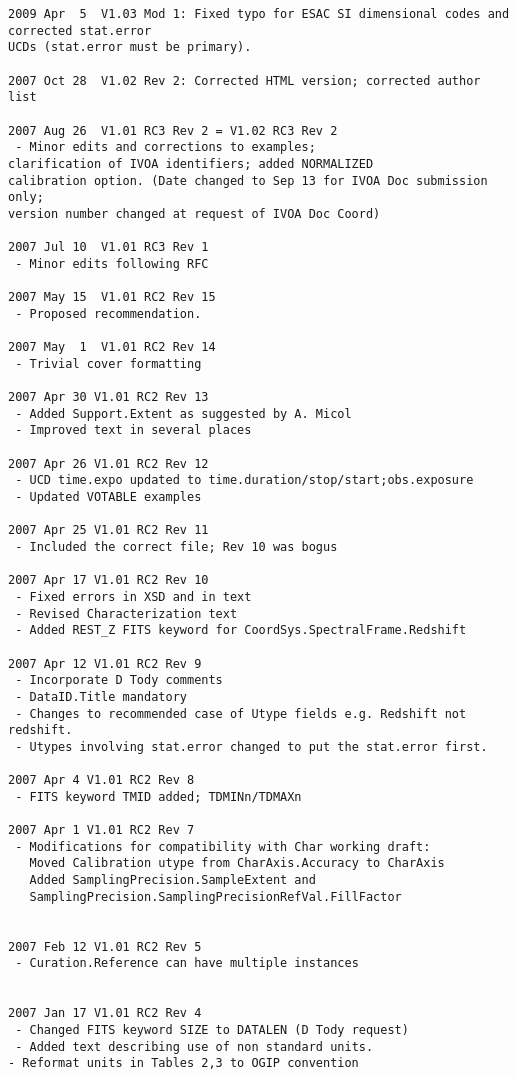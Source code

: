 \documentclass[11pt]{article}
\begin{document}
\begin{verbatim}
2009 Apr  5  V1.03 Mod 1: Fixed typo for ESAC SI dimensional codes and corrected stat.error
UCDs (stat.error must be primary).

2007 Oct 28  V1.02 Rev 2: Corrected HTML version; corrected author list

2007 Aug 26  V1.01 RC3 Rev 2 = V1.02 RC3 Rev 2
 - Minor edits and corrections to examples;
clarification of IVOA identifiers; added NORMALIZED
calibration option. (Date changed to Sep 13 for IVOA Doc submission only;
version number changed at request of IVOA Doc Coord)

2007 Jul 10  V1.01 RC3 Rev 1
 - Minor edits following RFC

2007 May 15  V1.01 RC2 Rev 15
 - Proposed recommendation.

2007 May  1  V1.01 RC2 Rev 14
 - Trivial cover formatting

2007 Apr 30 V1.01 RC2 Rev 13
 - Added Support.Extent as suggested by A. Micol
 - Improved text in several places

2007 Apr 26 V1.01 RC2 Rev 12
 - UCD time.expo updated to time.duration/stop/start;obs.exposure
 - Updated VOTABLE examples

2007 Apr 25 V1.01 RC2 Rev 11
 - Included the correct file; Rev 10 was bogus

2007 Apr 17 V1.01 RC2 Rev 10
 - Fixed errors in XSD and in text
 - Revised Characterization text
 - Added REST_Z FITS keyword for CoordSys.SpectralFrame.Redshift

2007 Apr 12 V1.01 RC2 Rev 9
 - Incorporate D Tody comments
 - DataID.Title mandatory
 - Changes to recommended case of Utype fields e.g. Redshift not redshift.
 - Utypes involving stat.error changed to put the stat.error first.

2007 Apr 4 V1.01 RC2 Rev 8
 - FITS keyword TMID added; TDMINn/TDMAXn

2007 Apr 1 V1.01 RC2 Rev 7
 - Modifications for compatibility with Char working draft:
   Moved Calibration utype from CharAxis.Accuracy to CharAxis
   Added SamplingPrecision.SampleExtent and
   SamplingPrecision.SamplingPrecisionRefVal.FillFactor
   
 
2007 Feb 12 V1.01 RC2 Rev 5
 - Curation.Reference can have multiple instances


2007 Jan 17 V1.01 RC2 Rev 4
 - Changed FITS keyword SIZE to DATALEN (D Tody request)
 - Added text describing use of non standard units.
- Reformat units in Tables 2,3 to OGIP convention


\end{verbatim}
\end{document}
